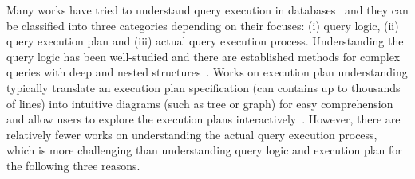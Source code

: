 Many works have tried to understand query execution in databases~\cite{} and they can be classified into three categories depending on their focuses: (i) query logic, (ii) query execution plan and (iii) actual query execution process. Understanding the query logic has been well-studied and there are established methods for complex  queries with deep and nested structures~\cite{}. Works on execution plan understanding typically translate an execution plan specification (can contains up to thousands of lines) into intuitive diagrams (such as tree or graph) for easy comprehension and allow users to explore the execution plans interactively~\cite{}. However, there are relatively fewer works on understanding the actual query execution process, which is more challenging than understanding query logic and execution plan for the following three reasons.      


%
%


